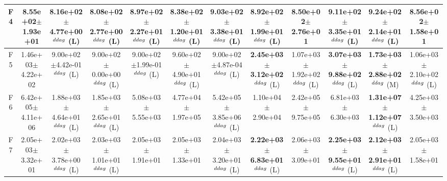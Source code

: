 \begin{table}[!t]
\begin{tabular}{c|ccccccccccc}
F4  & 8.55e+02$\pm$1.93e+01  & 8.16e+02$\pm$4.77e+00$^{\\ddag}$ (L)  & 8.08e+02$\pm$2.77e+00$^{\\ddag}$ (L)  & \textbf{8.97e+02$\pm$2.27e+01}$^{\\ddag}$ (L)  & 8.38e+02$\pm$1.20e+01$^{\\ddag}$ (L)  & \textbf{9.03e+02$\pm$3.38e+01}$^{\\ddag}$ (L)  & \textbf{8.92e+02$\pm$1.99e+01}$^{\\ddag}$ (L)  & 8.50e+02$\pm$2.76e+01   & \textbf{9.11e+02$\pm$3.35e+01}$^{\\ddag}$ (L)  & \textbf{9.24e+02$\pm$2.14e+01}$^{\\ddag}$ (L)  & 8.56e+02$\pm$1.58e+01  \\ \hline
F5  & 1.46e+03$\pm$4.22e+02  & 9.00e+02$\pm$4.42e-01$^{\\ddag}$ (L)  & 9.00e+02$\pm$0.00e+00$^{\\ddag}$ (L)  & 9.00e+02$\pm$1.99e-01$^{\\ddag}$ (L)  & 9.60e+02$\pm$4.90e+01$^{\\ddag}$ (L)  & 9.00e+02$\pm$4.87e-04$^{\\ddag}$ (L)  & \textbf{2.45e+03$\pm$3.12e+02}$^{\\ddag}$ (L)  & 1.07e+03$\pm$1.92e+02$^{\\ddag}$ (L)  & \textbf{3.07e+03$\pm$9.88e+02}$^{\\ddag}$ (L)  & \textbf{1.73e+03$\pm$2.88e+02}$^{\\ddag}$ (M)  & 1.06e+03$\pm$2.10e+02$^{\\ddag}$ (L) \\ \hline
F6  & 6.42e+05$\pm$4.11e+06  & 1.88e+03$\pm$4.64e+01$^{\\ddag}$ (L)  & 1.85e+03$\pm$2.65e+01$^{\\ddag}$ (L)  & 5.08e+03$\pm$5.55e+03   & 4.77e+04$\pm$1.97e+05   & 5.42e+05$\pm$3.85e+06$^{\\ddag}$ (L)  & 1.10e+04$\pm$2.90e+04   & 2.42e+05$\pm$9.75e+05   & 6.81e+03$\pm$6.30e+03   & \textbf{1.31e+07$\pm$1.12e+07}$^{\\ddag}$ (L)  & 4.25e+03$\pm$3.50e+03  \\ \hline
F7  & 2.05e+03$\pm$3.32e+01  & 2.02e+03$\pm$3.78e+00$^{\\ddag}$ (L)  & 2.03e+03$\pm$1.01e+01$^{\\ddag}$ (L)  & 2.05e+03$\pm$1.91e+01   & 2.05e+03$\pm$1.33e+01   & 2.04e+03$\pm$3.20e+01$^{\\ddag}$ (L)  & \textbf{2.22e+03$\pm$6.83e+01}$^{\\ddag}$ (L)  & 2.06e+03$\pm$3.09e+01   & \textbf{2.25e+03$\pm$9.55e+01}$^{\\ddag}$ (L)  & \textbf{2.12e+03$\pm$2.91e+01}$^{\\ddag}$ (L)  & 2.05e+03$\pm$1.58e+01  \\ \hline

\end{tabular}
\end{table}

